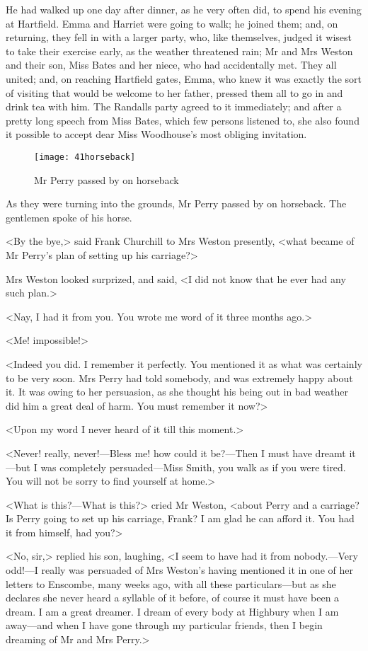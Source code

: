 He had walked up one day after dinner, as he very often did, to spend his evening at Hartfield. Emma and Harriet were going to walk; he joined them; and, on returning, they fell in with a larger party, who, like themselves, judged it wisest to take their exercise early, as the weather threatened rain; Mr and Mrs Weston and their son, Miss Bates and her niece, who had accidentally met. They all united; and, on reaching Hartfield gates, Emma, who knew it was exactly the sort of visiting that would be welcome to her father, pressed them all to go in and drink tea with him. The Randalls party agreed to it immediately; and after a pretty long speech from Miss Bates, which few persons listened to, she also found it possible to accept dear Miss Woodhouse's most obliging invitation.

\begin{figure}[tbph]
\centering
\texttt{[image: 41horseback]}
\caption{Mr Perry passed by on horseback}
\end{figure}

As they were turning into the grounds, Mr Perry passed by on horseback. The gentlemen spoke of his horse.

<By the bye,> said Frank Churchill to Mrs Weston presently, <what became of Mr Perry's plan of setting up his carriage?>

Mrs Weston looked surprized, and said, <I did not know that he ever had any such plan.>

<Nay, I had it from you. You wrote me word of it three months ago.>

<Me! impossible!>

<Indeed you did. I remember it perfectly. You mentioned it as what was certainly to be very soon. Mrs Perry had told somebody, and was extremely happy about it. It was owing to her persuasion, as she thought his being out in bad weather did him a great deal of harm. You must remember it now?>

<Upon my word I never heard of it till this moment.>

<Never! really, never!—Bless me! how could it be?—Then I must have dreamt it—but I was completely persuaded—Miss Smith, you walk as if you were tired. You will not be sorry to find yourself at home.>

<What is this?—What is this?> cried Mr Weston, <about Perry and a carriage? Is Perry going to set up his carriage, Frank? I am glad he can afford it. You had it from himself, had you?>

<No, sir,> replied his son, laughing, <I seem to have had it from nobody.—Very odd!—I really was persuaded of Mrs Weston's having mentioned it in one of her letters to Enscombe, many weeks ago, with all these particulars—but as she declares she never heard a syllable of it before, of course it must have been a dream. I am a great dreamer. I dream of every body at Highbury when I am away—and when I have gone through my particular friends, then I begin dreaming of Mr and Mrs Perry.>

